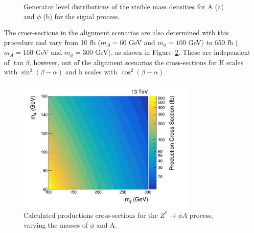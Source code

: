 \begin{figure}[t]
\centering
\caption[Plots of the $Z\rightarrow\phi\PA$ generator level distributions of the visible masses $m^{A}_{\text{vis}}$ and $m^{\phi}_{\text{vis}}$.]{Generator level distributions of the visible mass densities for A (a) and $\phi$ (b) for the signal process.}
\label{fig:4tau_gen_dist}
\end{figure}

The cross-sections in the alignment scenarios are also determined with this procedure and vary from 10 fb ($m_{A}=60$ GeV and $m_{\phi}=100$ GeV) to 650 fb ($m_{A}=160$ GeV and $m_{\phi}=300$ GeV), as shown in Figure~\ref{fig:4tau_xs}.
These are independent of $\tan\beta$, however, out of the alignment scenarios the cross-sections for H scales with $\sin^{2}(\beta-\alpha)$ and h scales with $\cos^{2}(\beta-\alpha)$. \\

\begin{figure}[!hbtp]
\centering
    \includegraphics[width=0.8\textwidth]{Figures/cross_sections.png}
\caption[Plot of the production cross-sections for the $Z^{*} \rightarrow \phi A$ process.]{Calculated productions cross-sections for the $Z^{*} \rightarrow \phi A$ process, varying the masses of $\phi$ and A.}
\label{fig:4tau_xs}
\end{figure}

